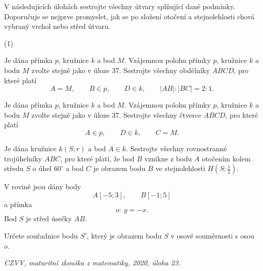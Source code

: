\documentclass[12pt,a4paper]{article}
\begin{document}
\begin{exercise}

    V následujících úlohách sestrojte všechny útvary splňující dané podmínky.
    Doporučuje se nejprve promyslet, jak se po složení otočení a stejnolehlosti chová vybraný vrchol nebo střed útvaru.

    \begin{tasks}(1)

        \task Je dána přímka $p$, kružnice $k$ a bod $M$.
        Vzájemnou polohu přímky $p$, kružnice $k$ a bodu $M$ zvolte stejně jako v úloze 37.
        Sestrojte všechny obdélníky $ABCD$, pro které platí
        \[
            A=M,\qquad B\in p,\qquad D\in k,\qquad |AB|:|BC|=2:1.
        \]

        \task Je dána přímka $p$, kružnice $k$ a bod $M$.
        Vzájemnou polohu přímky $p$, kružnice $k$ a bodu $M$ zvolte stejně jako v úloze 37.
        Sestrojte všechny čtverce $ABCD$, pro které platí
        \[
            A\in p,\qquad D\in k,\qquad C=M.
        \]

        \task Je dána kružnice $k(S;r)$ a bod $A\in k$.
        Sestrojte všechny rovnostranné trojúhelníky $ABC$, pro které platí, že bod $B$ vznikne z bodu $A$ otočením kolem středu $S$ o úhel $60^\circ$ a bod $C$ je obrazem bodu $B$ ve stejnolehlosti $H(S;\tfrac12)$.

    \end{tasks}

\end{exercise}



\setcounter{section}{7}


\begin{exercise}

    V rovině jsou dány body
    \[
        A[-5;3],
        \qquad
        B[-1;5]
    \]
    a přímka
    \[
        o:\ y=-x.
    \]
    Bod $S$ je střed úsečky $AB$.

    Určete souřadnice bodu $S'$, který je obrazem bodu $S$ v osové souměrnosti s osou $o$.

    \begin{flushright}
        \textit{CZVV, maturitní zkouška z matematiky, 2020, úloha 23.}
    \end{flushright}

\end{exercise}
\end{document}
